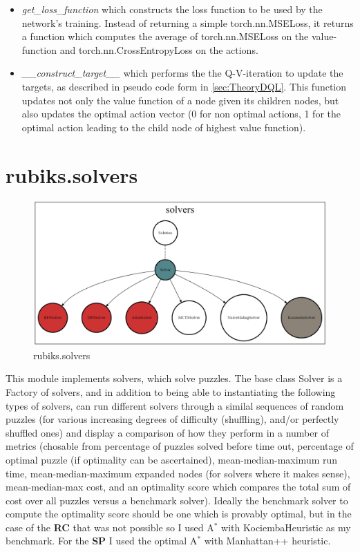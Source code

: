 \begin{itemize}
\begin{itemize}
\item \textit{get\_loss\_function} which constructs the loss function to be used by the network's training. Instead of returning a simple torch.nn.MSELoss, it returns a function which computes the average of torch.nn.MSELoss on the value-function and torch.nn.CrossEntropyLoss on the actions.
\item \textit{\_\_construct\_target\_\_} which performs the the Q-V-iteration to update the targets, as described in pseudo code form in \ref{sec:TheoryDQL}. This function updates not only the value function of a node given its children nodes, but also updates the optimal action vector (0 for non optimal actions, 1 for the optimal action leading to the child node of highest value function).
\end{itemize} 


\end{itemize}


\section{rubiks.solvers}
\label{sec:codesolvers}
\begin{figure}[H]
\centering
\includegraphics[scale=0.25]{./Figures/codebasesolvers}
\caption[Codebase]{rubiks.solvers}
\label{fig:Codebasesolvers}
\end{figure}
This module implements solvers, which solve puzzles. The base class Solver is a Factory of solvers, and in addition to being able to instantiating the following types of solvers, can run different solvers through a similal sequences of random puzzles (for various increasing degrees of difficulty (shuffling), and/or perfectly shuffled ones) and display a comparison of how they perform in a number of metrics (chosable from percentage of puzzles solved before time out, percentage of optimal puzzle (if optimality can be ascertained), mean-median-maximum run time, mean-median-maximum expanded nodes (for solvers where it makes sense), mean-median-max cost, and an optimality score which compares the total sum of cost over all puzzles versus a benchmark solver). Ideally the benchmark solver to compute the optimality score should be one which is provably optimal, but in the case of the \textbf{RC} that was not possible so I used A$^{*}$ with KociembaHeuristic as my benchmark. For the \textbf{SP} I used the optimal A$^{*}$ with Manhattan++ heuristic.

